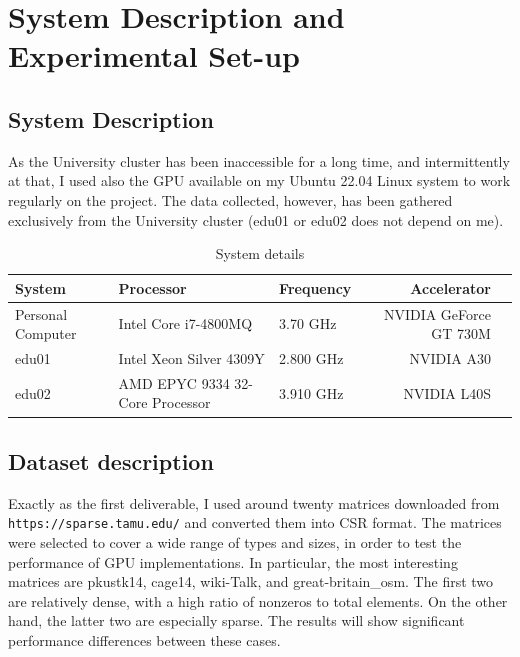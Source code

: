 \documentclass[conference]{IEEEtran}
\begin{document}
\section{System Description and Experimental Set-up}

\subsection{System Description}

As the University cluster has been inaccessible for a long time, and intermittently at that, I used also the GPU available on my Ubuntu 22.04 Linux system to work regularly on the project.
The data collected, however, has been gathered exclusively from the University cluster (edu01 or edu02 does not depend on me).

\begin{table}[ht]
    \centering
    \begin{adjustbox}{width=\columnwidth}
    \begin{tabular}{lllrl}
    \toprule
    \textbf{System} &  \textbf{Processor} & \textbf{Frequency} & \textbf{Accelerator} \\
    \midrule
        Personal Computer &  Intel Core i7-4800MQ & 3.70 GHz & NVIDIA GeForce GT 730M \\
        edu01 & Intel Xeon Silver 4309Y & 2.800 GHz & NVIDIA A30 \\
        edu02 & AMD EPYC 9334 32-Core Processor & 3.910 GHz & NVIDIA L40S \\
    \bottomrule
    \end{tabular}
    \end{adjustbox}
    \vspace{1em}
    
    \caption{System details}
    \label{tab:system_description}
\end{table}

\subsection{Dataset description}

Exactly as the first deliverable, I used around twenty matrices downloaded from \texttt{https://sparse.tamu.edu/} and converted them into CSR format. The matrices were selected to cover a wide range of types and sizes, in order to test the performance of GPU implementations. In particular, the most interesting matrices are pkustk14, cage14, wiki-Talk, and great-britain\_osm. The first two are relatively dense, with a high ratio of nonzeros to total elements. On the other hand, the latter two are especially sparse. The results will show significant performance differences between these cases.
\end{document}
